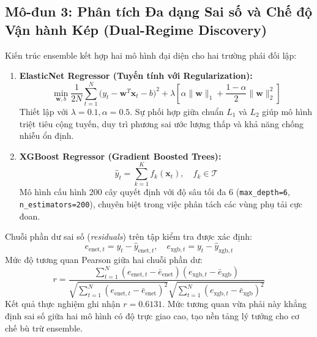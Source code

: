 \subsection{Mô-đun 3: Phân tích Đa dạng Sai số và Chế độ Vận hành Kép (Dual-Regime Discovery)}
\label{subsec:module3}

Kiến trúc ensemble kết hợp hai mô hình đại diện cho hai trường phái đối lập:
\begin{enumerate}
    \item \textbf{ElasticNet Regressor (Tuyến tính với Regularization):}
    \begin{equation}
        \min_{\mathbf{w}, b} \frac{1}{2N} \sum_{t=1}^N \Big(y_t - \mathbf{w}^T \mathbf{x}_t - b\Big)^2 + \lambda \left[ \alpha \|\mathbf{w}\|_1 + \frac{1 - \alpha}{2} \|\mathbf{w}\|_2^2 \right]
    \end{equation}
    Thiết lập với $\lambda = 0.1, \alpha = 0.5$. Sự phối hợp giữa chuẩn $L_1$ và $L_2$ giúp mô hình triệt tiêu cộng tuyến, duy trì phương sai ước lượng thấp và khả năng chống nhiễu ổn định.

    \item \textbf{XGBoost Regressor (Gradient Boosted Trees):}
    \begin{equation}
        \hat{y}_t = \sum_{k=1}^K f_k(\mathbf{x}_t), \quad f_k \in \mathcal{T}
    \end{equation}
    Mô hình cấu hình 200 cây quyết định với độ sâu tối đa 6 (\texttt{max\_depth=6}, \texttt{n\_estimators=200}), chuyên biệt trong việc phân tách các vùng phụ tải cực đoan.
\end{enumerate}

Chuỗi phần dư sai số (\textit{residuals}) trên tập kiểm tra được xác định:
\begin{equation}
    e_{\text{enet}, t} = y_t - \hat{y}_{\text{enet}, t}, \quad e_{\text{xgb}, t} = y_t - \hat{y}_{\text{xgb}, t}
\end{equation}
Mức độ tương quan Pearson giữa hai chuỗi phần dư:
\begin{equation}
    r = \frac{\sum_{t=1}^N (e_{\text{enet}, t} - \bar{e}_{\text{enet}})(e_{\text{xgb}, t} - \bar{e}_{\text{xgb}})}{\sqrt{\sum_{t=1}^N (e_{\text{enet}, t} - \bar{e}_{\text{enet}})^2} \sqrt{\sum_{t=1}^N (e_{\text{xgb}, t} - \bar{e}_{\text{xgb}})^2}}
\end{equation}
Kết quả thực nghiệm ghi nhận \textbf{$r = 0.6131$}. Mức tương quan vừa phải này khẳng định sai số giữa hai mô hình có độ trực giao cao, tạo nền tảng lý tưởng cho cơ chế bù trừ ensemble.

